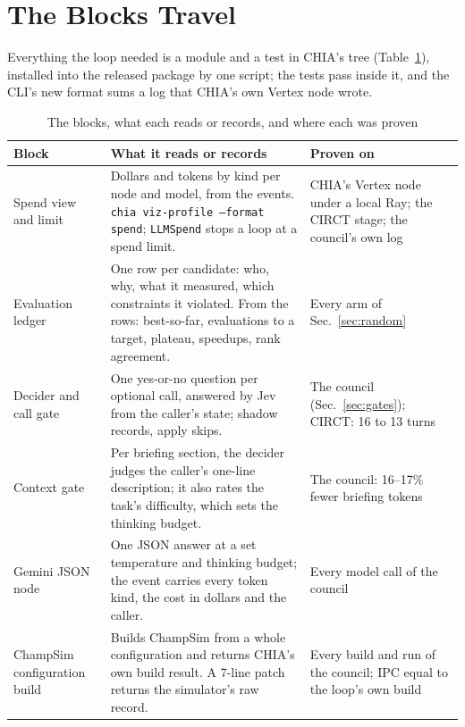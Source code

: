 \documentclass[conference]{IEEEtran}
\begin{document}
\section{The Blocks Travel}\label{sec:blocks}
Everything the loop needed is a module and a test in CHIA's tree (Table~\ref{tab:blocks}),
installed into the released package by one script; the tests pass inside it, and the CLI's new
format sums a log that CHIA's own Vertex node wrote.

\begin{table}[!t]
\caption{The blocks, what each reads or records, and where each was proven}
\label{tab:blocks}
\centering
\scriptsize
\renewcommand{\arraystretch}{0.92}
\begin{tabular}{@{}>{\raggedright\arraybackslash}p{1.35cm}@{\hspace{4pt}}>{\raggedright\arraybackslash}p{4.55cm}@{\hspace{4pt}}>{\raggedright\arraybackslash}p{2.15cm}@{}}
\toprule
\textbf{Block} & \textbf{What it reads or records} & \textbf{Proven on} \\
\midrule
Spend view and limit &
Dollars and tokens by kind per node and model, from the events. \texttt{chia viz-profile --format
spend}; \texttt{LLMSpend} stops a loop at a spend limit. &
CHIA's Vertex node under a local Ray; the CIRCT stage; the council's own log \\
\addlinespace[2pt]
Evaluation ledger &
One row per candidate: who, why, what it measured, which constraints it violated. From the rows:
best-so-far, evaluations to a target, plateau, speedups, rank agreement. &
Every arm of Sec.~\ref{sec:random} \\
\addlinespace[2pt]
Decider and call gate &
One yes-or-no question per optional call, answered by Jev from the caller's state; shadow
records, apply skips. &
The council (Sec.~\ref{sec:gates}); CIRCT: 16 to 13 turns \\
\addlinespace[2pt]
Context gate &
Per briefing section, the decider judges the caller's one-line description; it also rates the
task's difficulty, which sets the thinking budget. &
The council: 16--17\% fewer briefing tokens \\
\addlinespace[2pt]
Gemini JSON node &
One JSON answer at a set temperature and thinking budget; the event carries every token kind,
the cost in dollars and the caller. &
Every model call of the council \\
\addlinespace[2pt]
ChampSim configuration build &
Builds ChampSim from a whole configuration and returns CHIA's own build result. A 7-line patch
returns the simulator's raw record. &
Every build and run of the council; IPC equal to the loop's own build \\
\bottomrule
\end{tabular}
\end{table}
\end{document}
